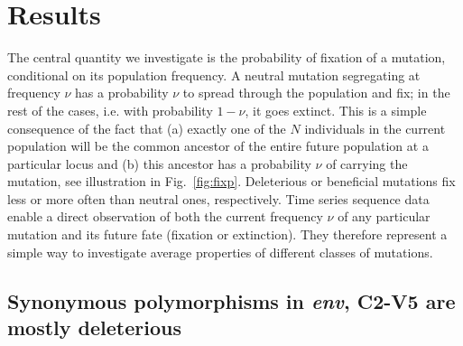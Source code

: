 \documentclass[rmp, twocolumn]{revtex4}
\newcommand{\env}{\textit{env}}
\newcommand{\FIG}[1]{Fig.~\ref{fig:#1}}
\begin{document}
\section{Results}
The central quantity we investigate is the probability of fixation
of a mutation, conditional on its population frequency.
A neutral mutation segregating at frequency $\nu$ has a probability $\nu$ to
spread through the population and fix; in the rest of the cases, i.e. with probability
$1-\nu$, it goes extinct. This is a simple consequence of the fact that (a) exactly
one of the $N$ individuals in the current population will be the common ancestor
of the entire future population at a
particular locus and (b) this ancestor has a probability $\nu$ of carrying the
mutation, see illustration in \FIG{fixp}. Deleterious or beneficial
mutations fix less or more often than neutral ones, respectively. Time series
sequence data enable a direct observation of both the current frequency $\nu$ of
any particular mutation and its future fate (fixation or extinction).
They therefore represent a simple way to investigate average properties
of different classes of mutations. 

\subsection{Synonymous polymorphisms in \env, C2-V5 are mostly deleterious}
\end{document}
